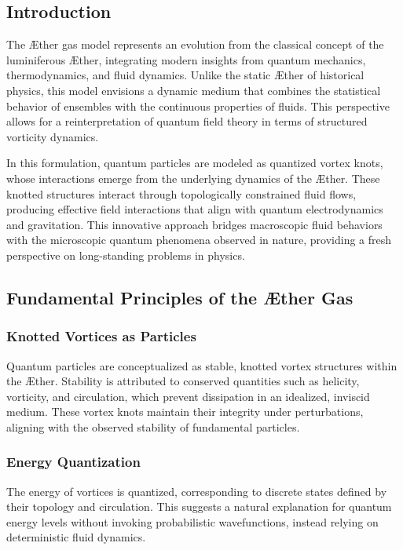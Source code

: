 \documentclass[a4paper,10pt]{article}
\begin{document}
\subsection*{Introduction}
The Æther gas model represents an evolution from the classical concept of the luminiferous Æther, integrating modern insights from quantum mechanics, thermodynamics, and fluid dynamics. Unlike the static Æther of historical physics, this model envisions a dynamic medium that combines the statistical behavior of ensembles with the continuous properties of fluids. This perspective allows for a reinterpretation of quantum field theory in terms of structured vorticity dynamics.


In this formulation, quantum particles are modeled as quantized vortex knots, whose interactions emerge from the underlying dynamics of the Æther. These knotted structures interact through topologically constrained fluid flows, producing effective field interactions that align with quantum electrodynamics and gravitation. This innovative approach bridges macroscopic fluid behaviors with the microscopic quantum phenomena observed in nature, providing a fresh perspective on long-standing problems in physics.


\subsection*{Fundamental Principles of the Æther Gas}
\subsubsection*{Knotted Vortices as Particles}
Quantum particles are conceptualized as stable, knotted vortex structures within the Æther. Stability is attributed to conserved quantities such as helicity, vorticity, and circulation, which prevent dissipation in an idealized, inviscid medium. These vortex knots maintain their integrity under perturbations, aligning with the observed stability of fundamental particles.


\subsubsection*{Energy Quantization}
The energy of vortices is quantized, corresponding to discrete states defined by their topology and circulation. This suggests a natural explanation for quantum energy levels without invoking probabilistic wavefunctions, instead relying on deterministic fluid dynamics.
\end{document}
